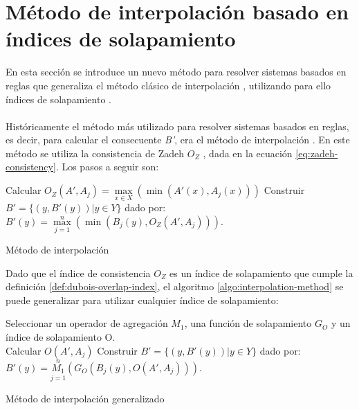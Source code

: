\section{Método de interpolación basado en índices de solapamiento}\label{sec:interpolation-method}
En esta sección se introduce un nuevo método para resolver sistemas basados en reglas que generaliza el método clásico de interpolación , utilizando para ello índices de solapamiento \cite{bustince2013overlap}.\\
\\
Históricamente el método más utilizado para resolver sistemas basados en reglas, es decir, para calcular el consecuente \emph{B'}, era el método de interpolación \cite{klir1987}. En este método se utiliza la consistencia de Zadeh \emph{$O_{Z}$} \cite{zadeh1978}, dada en la ecuación \ref{eq:zadeh-consistency}. Los pasos a seguir son:

\begin{algorithm}
\DontPrintSemicolon
{}
\vspace{0.4 cm}
 {
Calcular $O_{Z}(A',A_{j}) = \max\limits_{x \in X}(\min(A'(x),A_{j}(x))) $
}
Construir $B' = \{(y, B'(y))|y \in Y\}$ dado por: \\
\centering
\nonl $B'(y) = \max\limits_{j=1}^{n}(\min(B_{j}(y),O_{Z}(A', A_{j})))$.\\
\;
\caption{Método de interpolación}
\label{algo:interpolation-method}
\end{algorithm}
Dado que el índice de consistencia $O_{Z}$ es un índice de solapamiento que cumple la definición \ref{def:dubois-overlap-index}, el algoritmo \ref{algo:interpolation-method} se puede generalizar para utilizar cualquier índice de solapamiento:

\begin{algorithm}
\DontPrintSemicolon
{}
\vspace{0.4 cm}
Seleccionar un operador de agregación $M_{1}$, una función de solapamiento $G_{O}$ y un índice de solapamiento O.\\
 {
Calcular $O(A', A_{j})$
}
Construir $B' = \{(y, B'(y))|y \in Y\}$ dado por: \\
\centering
\nonl $B'(y) = \overset{n}{\underset{j=1}{M_{1}}}(G_{O}(B_{j}(y),O(A', A_{j})))$.\\
\;
\caption{Método de interpolación generalizado}
\label{algo:overlap-interpolation-method}
\end{algorithm}

